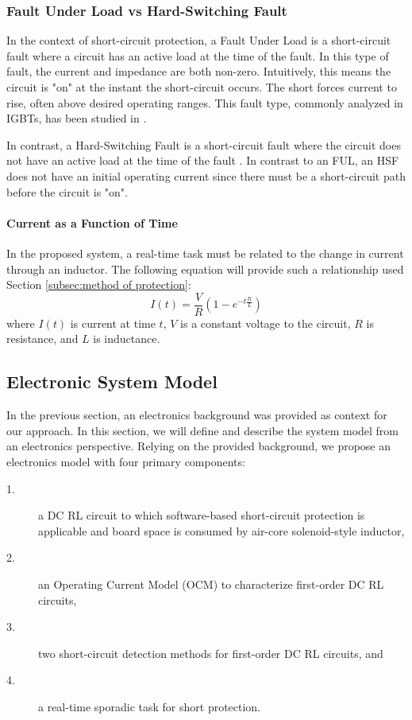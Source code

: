 \subsubsection{Fault Under Load vs Hard-Switching Fault}
In the context of short-circuit protection, a Fault Under Load is a short-circuit fault where a circuit has an active load at the time of the fault. In this type of fault, the current and impedance are both non-zero. Intuitively, this means the circuit is "on" at the instant the short-circuit occurs. The short forces current to rise, often above desired operating ranges. This fault type, commonly analyzed in IGBTs, has been studied in \cite{pagano_short_2005}.

In contrast, a Hard-Switching Fault is a short-circuit fault where the circuit does not have an active load at the time of the fault \cite{horiguchi_high-speed_2015}. In contrast to an FUL, an HSF does not have an initial operating current since there must be a short-circuit path before the circuit is "on".

\paragraph{Current as a Function of Time}
In the proposed system, a real-time task must be related to the change in current through an inductor. The following equation will provide such a relationship used Section \ref{subsec:method of protection}:
\begin{equation}\label{eq:CurrentAtTime}
I(t) = \frac{V}{R}(1-e^{-t \frac{R}{L}})
\end{equation}
where $I(t)$ is current at time $t$, $V$ is a constant voltage to the circuit, $R$ is resistance, and $L$ is inductance.
\clearpage \subsection{Electronic System Model}\label{subsec:electronic system model}
In the previous section, an electronics background was provided as context for our approach.
In this section, we will define and describe the system model from an electronics perspective. Relying on the provided background, we propose an electronics model with four primary components:
\begin{description}
\item [1.] a DC RL circuit to which software-based short-circuit protection is applicable and board space is consumed by air-core solenoid-style inductor,
\item [2.] an Operating Current Model (OCM) to characterize first-order DC RL circuits,
\item [3.] two short-circuit detection methods for first-order DC RL circuits, and
\item [4.] a real-time sporadic task for short protection.
\end{description}

